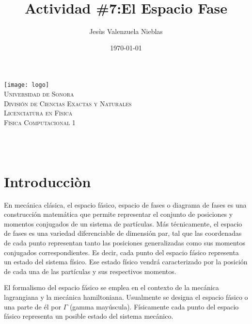 \documentclass[12pt]{article}
\title{Actividad \#7:El Espacio Fase}
\author{\Large Jesùs Valenzuela Nieblas\\}
\date{\today}
\makeatletter
\let\thetitle\@title
\let\theauthor\@author
\makeatother
\begin{document}

\begin{titlepage}
	\centering
    \vspace*{.5cm}
     \texttt{[image: logo]}\\	%
    \textsc{\Large Universidad de Sonora}\\[1.0 cm]	%
	\textsc{\Large División de Ciencias Exactas y Naturales}\\[.50 cm]
  	\textsc{\Large Licenciatura en Fìsica}\\[.5 cm]
  \textsc{\large Fìsica Computacional 1}\\[1.5 cm]				%
	
	{ \huge \bfseries \thetitle}\\

    \vspace*{3 cm}
	\begin{minipage}{\textwidth}
    \centering
    \theauthor
	\end{minipage}\\[3 cm]
	
 
	\vfill
	
\end{titlepage}


\section{Introducciòn}
En mecánica clásica, el espacio fásico, espacio de fases o diagrama de fases es una construcción matemática que permite representar el conjunto de posiciones y momentos conjugados de un sistema de partículas. Más técnicamente, el espacio de fases es una variedad diferenciable de dimensión par, tal que las coordenadas de cada punto representan tanto las posiciones generalizadas como sus momentos conjugados correspondientes. Es decir, cada punto del espacio fásico representa un estado del sistema físico. Ese estado físico vendrá caracterizado por la posición de cada una de las partículas y sus respectivos momentos.

El formalismo del espacio fásico se emplea en el contexto de la mecánica lagrangiana y la mecánica hamiltoniana. Usualmente se designa el espacio fásico o una parte de él por $\Gamma$ (gamma mayúscula). Físicamente cada punto del espacio fásico representa un posible estado del sistema mecánico.
\end{document}
